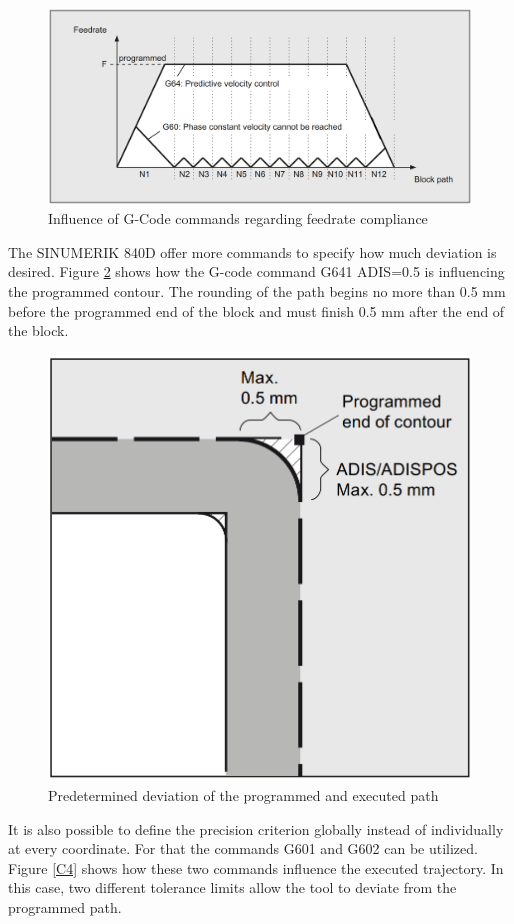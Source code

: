  \begin{figure}[H]
 	\centerline{\includegraphics[width=\textwidth]{figures/conti1.png}}
 	\caption{Influence of G-Code commands regarding feedrate compliance~\cite{sinumericmanual}}
 	\label{C2}
 \end{figure}
 
The SINUMERIK 840D offer more commands to specify how much deviation is desired.
Figure \ref{C3} shows how the G-code command G641 ADIS=0.5 is influencing the programmed contour. The rounding of the path begins no more than 0.5 mm before the programmed end of the block and must finish 0.5 mm after the end of the block. 
 
 \begin{figure}[H]
 	\centerline{\includegraphics[scale=.3]{figures/conti2.png}}
 	\caption{Predetermined deviation of the programmed and executed path~\cite{sinumericmanual}}
 	\label{C3}
 \end{figure}
 \newpage
It is also possible to define the precision criterion globally instead of individually at every coordinate. For that the commands G601 and G602 can be utilized. Figure \ref{C4} shows how these two commands influence the executed trajectory. In this case, two different tolerance limits allow the tool to deviate from the programmed path.
 
